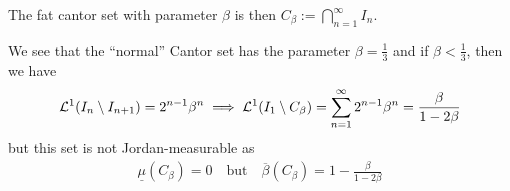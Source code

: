 The fat cantor set with parameter $\beta$ is then $C_{\beta} := \bigcap_{n=1}^{\infty}I_n$.

We see that the ``normal'' Cantor set has the parameter $\beta = \frac{1}{3}$ and if $\beta < \frac{1}{3}$, then we have
\begin{align*}
  \mathcal{L}^{1}(I_n \setminus I_{n+1}) = 2^{n-1}\beta^{n} \implies \mathcal{L}^{1}(I_1 \setminus C_{\beta}) = \sum_{n=1}^{\infty} 2^{n-1} \beta^{n} = \frac{\beta}{1 - 2 \beta}
\end{align*}
but this set is not Jordan-measurable as 
\begin{align*}
  \underline{\mu}(C_{\beta}) = 0 \quad \text{but} \quad \overline{\beta}(C_{\beta}) = 1 - \frac{\beta}{1 - 2 \beta}
\end{align*}

